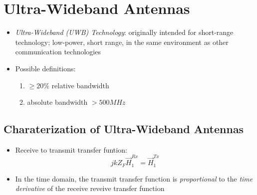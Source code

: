 \section{Ultra-Wideband Antennas}
\begin{itemize}
    \itemsep0pt
    \item \textit{Ultra-Wideband (UWB) Technology}: originally intended for short-range technology; low-power, short range, in the same environment as other communication technologies
    \item Possible definitions:
        \begin{enumerate}
            \item $\geq 20\%$ relative bandwidth
            \item absolute bandwidth $> 500\si{MHz}$
        \end{enumerate}
\end{itemize}

\subsection{Charaterization of Ultra-Wideband Antennas}
\begin{itemize}
    \itemsep0pt
    \item Receive to transmit transfer funtion:
        \begin{equation*}
            jkZ_F \vec{H}^{Rx}_1 = \vec{H}^{Tx}_1
        \end{equation*}
    \item In the time domain, the transmit transfer function is \textit{proportional} to the \textit{time derivative} of the receive reveive transfer function
\end{itemize}

